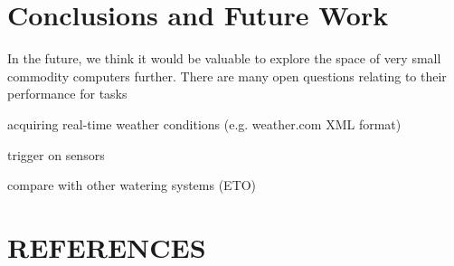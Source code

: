 \documentclass[a4paper]{acm_proc_article-sp}
\begin{document}
\section{Conclusions and Future Work}

In the future, we think it would be valuable to explore the space of very small commodity computers further.  There are many open questions relating to their performance for tasks

acquiring real-time weather conditions (e.g. weather.com XML format)

trigger on sensors

compare with other watering systems (ETO)

\section{REFERENCES}
\end{document}

